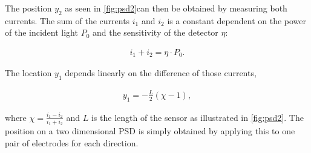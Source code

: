 The position $y_2$ as seen in \ref{fig:psd2}can then be obtained by measuring both currents. The sum of the currents $i_1$ and $i_2$ is a constant dependent on the power of the incident light $P_0$ and the sensitivity of the detector $\eta$:

\begin{eqnarray}
i_1 + i_2 = \eta \cdot P_0.
\end{eqnarray}

The location $y_1$ depends linearly on the difference of those currents,

\begin{eqnarray}
y_1 = -\frac{L}{2}(\chi-1),
\end{eqnarray}

where $\chi = \frac{i_1-i_2}{i_1+i_2}$ and $L$ is the length of the sensor as illustrated in \ref{fig:psd2}. The position on a two dimensional PSD is simply obtained by applying this to one pair of electrodes for each direction.
